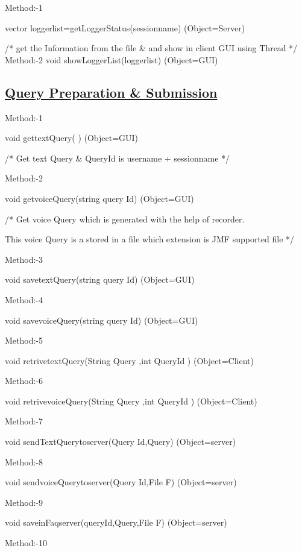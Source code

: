 \documentclass{article}
\begin{document}
Method:-1 

vector loggerlist=getLoggerStatus(sessionname)                             (Object=Server) 

/* get the Information from the file \&  and show in client GUI using Thread */      \\                 

Method:-2 
                                   void showLoggerList(loggerlist)                                              (Object=GUI)
\subsection*{\underline{Query Preparation \& Submission}}

Method:-1  

 void gettextQuery( )                           (Object=GUI) 
 
/* Get text Query \& QueryId is username + sessionname */ 

Method:-2 

  void getvoiceQuery(string query Id)  (Object=GUI) 

/* Get voice Query which is generated with the help of recorder. 

This  voice Query is a stored in a file which extension is JMF supported  
file */ 

Method:-3 

 void savetextQuery(string query Id)   (Object=GUI)  

  Method:-4                                             

 void savevoiceQuery(string query Id)    (Object=GUI) 

Method:-5 

void retrivetextQuery(String Query ,int QueryId )   (Object=Client) 

Method:-6              

void retrivevoiceQuery(String Query ,int QueryId )   (Object=Client) 

Method:-7 

 void sendTextQuerytoserver(Query Id,Query)           (Object=server) 

 Method:-8 

 void sendvoiceQuerytoserver(Query Id,File F)               (Object=server) 

 Method:-9        

 void saveinFaqserver(queryId,Query,File F)               (Object=server) 

Method:-10           
\end{document}
